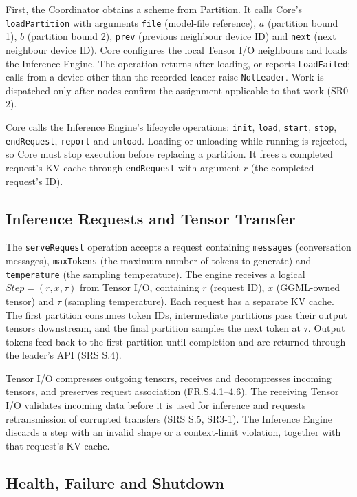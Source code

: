 \documentclass[12pt, titlepage]{article}
\begin{document}
First, the Coordinator obtains a scheme from Partition. It calls Core's
\texttt{loadPartition} with arguments \texttt{file} (model-file reference), $a$ (partition bound 1), $b$ (partition bound 2),
\texttt{prev} (previous neighbour device ID) and \texttt{next} (next neighbour device ID). Core configures the local
Tensor I/O neighbours and loads the Inference Engine. The operation
returns after loading, or reports \texttt{LoadFailed}; calls from a device
other than the recorded leader raise \texttt{NotLeader}. Work is dispatched
only after nodes confirm the assignment applicable to that work (SR0-2).

Core calls the Inference Engine's lifecycle operations:
\texttt{init}, \texttt{load}, \texttt{start}, \texttt{stop},
\texttt{endRequest}, \texttt{report} and \texttt{unload}. Loading or unloading while running is
rejected, so Core must stop execution before replacing a partition. It frees
a completed request's KV cache through \texttt{endRequest} with argument
$r$ (the completed request's ID).

\subsection{Inference Requests and Tensor Transfer}

The \texttt{serveRequest} operation accepts a request containing
\texttt{messages} (conversation messages), \texttt{maxTokens} (the maximum
number of tokens to generate) and \texttt{temperature} (the sampling temperature).
The engine receives a logical $\mathit{Step}=(r,x,\tau)$ from Tensor I/O,
containing $r$ (request ID), $x$ (GGML-owned tensor) and $\tau$ (sampling
temperature). Each request has a separate KV cache.
The first partition consumes token IDs, intermediate partitions pass their
output tensors downstream, and the final partition samples the next token at
$\tau$. Output tokens feed back to the first partition until completion
and are returned through the leader's API (SRS S.4).

Tensor I/O compresses outgoing tensors, receives and decompresses incoming
tensors, and preserves request association (FR.S.4.1--4.6). The receiving
Tensor I/O validates incoming data before it is used for inference and requests
retransmission of corrupted transfers (SRS S.5, SR3-1). The Inference Engine
discards a step with an invalid shape or a context-limit violation, together
with that request's KV cache.

\subsection{Health, Failure and Shutdown}
\end{document}
